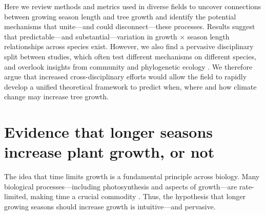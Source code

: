 \documentclass[11pt]{article}
\begin{document}
Here we review methods and metrics used in diverse fields to uncover connections between growing season length and tree growth and identify the potential mechanisms that unite---and could disconnect---these processes. %
Results suggest that predictable---and substantial---variation in growth $\times$ season length relationships across species exist. However, we also find a pervasive disciplinary split between studies, which often test different mechanisms on different species, and overlook insights from community and phylogenetic ecology \citep[e.g.][]{Grime:1977sw,Ackerly:2009ly,avila2023evidence}. We therefore argue that increased cross-disciplinary efforts would allow the field to rapidly develop a unified theoretical framework to predict when, where and how climate change may increase tree growth. %

\section*{Evidence that longer seasons increase plant growth, or not}
The idea that time limits growth is a fundamental principle across biology. Many biological processes---including photosynthesis and aspects of growth---are rate-limited, making time a crucial commodity \citep{nobel1983biophysical,cosgrove2005growth,hilty2021plant}. Thus, the hypothesis that longer growing seasons should increase growth is intuitive---and pervasive. 
\end{document}

